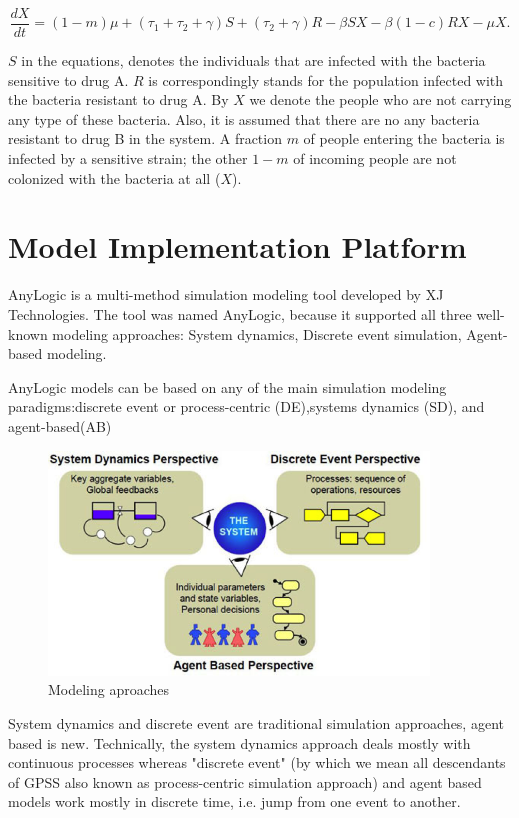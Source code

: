 \begin{equation}
\frac{dX}{dt} = (1 - m) \mu + (\tau_1 + \tau_2 + \gamma) S + (\tau_2 + \gamma) R - \beta S X - \beta (1-c) R X - \mu X.
\end{equation}

$S$ in the equations, denotes the individuals that are infected with the bacteria sensitive to drug A. $R$ is correspondingly stands for the population infected with the bacteria resistant to drug A. By $X$ we denote the people who are not carrying any type of these bacteria. Also, it is assumed that there are no any bacteria resistant to drug B in the system. A fraction $m$ of people entering the bacteria is infected by a sensitive strain; the other $1-m$ of incoming people are not colonized with the bacteria at all ($X$).

\section{Model Implementation Platform}

AnyLogic is a multi-method simulation modeling tool developed by XJ Technologies.
The tool was named AnyLogic, because it supported all three well-known modeling approaches: System dynamics, Discrete event simulation, Agent-based modeling.

AnyLogic models can be based on any of the main simulation modeling paradigms:discrete event or process-centric (DE),systems dynamics (SD), and agent-based(AB)

\begin{figure}
   \centering
	\includegraphics[width=0.9\textwidth]{img/system}
	\caption[Clear]{Modeling aproaches}
\end{figure}

System dynamics and discrete event are traditional simulation approaches, agent based is new. Technically, the system dynamics approach deals mostly with continuous processes whereas "discrete event" (by which we mean all descendants of GPSS also known as process-centric simulation approach) and agent based models work mostly in discrete time, i.e. jump from one event to another.

